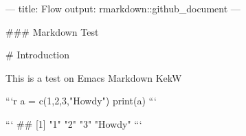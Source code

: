 ---
title: Flow
output: rmarkdown::github_document
---


### Markdown Test

# Introduction

This is a test on Emacs Markdown
KekW


```r
a = c(1,2,3,"Howdy")
print(a)
```

```
## [1] "1"     "2"     "3"     "Howdy"
```
